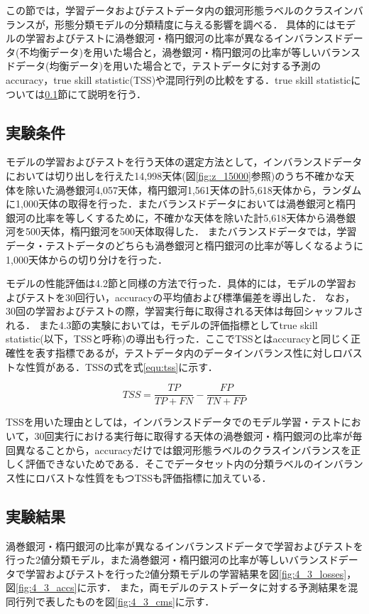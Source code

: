 \documentclass[a4j, 11pt]{jreport}
\begin{document}
この節では，学習データおよびテストデータ内の銀河形態ラベルのクラスインバランスが，形態分類モデルの分類精度に与える影響を調べる．
具体的にはモデルの学習およびテストに渦巻銀河・楕円銀河の比率が異なるインバランスドデータ(不均衡データ)を用いた場合と，渦巻銀河・楕円銀河の比率が等しいバランスドデータ(均衡データ)を用いた場合とで，テストデータに対する予測のaccuracy，true skill statistic(TSS)や混同行列の比較をする．true skill statisticについては\ref{sec:4-3-1}節にて説明を行う．

\subsection{実験条件}
\label{sec:4-3-1}
モデルの学習およびテストを行う天体の選定方法として，インバランスドデータにおいては切り出しを行えた14,998天体(図\ref{fig:z_15000}参照)のうち不確かな天体を除いた渦巻銀河4,057天体，楕円銀河1,561天体の計5,618天体から，ランダムに1,000天体の取得を行った．またバランスドデータにおいては渦巻銀河と楕円銀河の比率を等しくするために，不確かな天体を除いた計5,618天体から渦巻銀河を500天体，楕円銀河を500天体取得した．
またバランスドデータでは，学習データ・テストデータのどちらも渦巻銀河と楕円銀河の比率が等しくなるように1,000天体からの切り分けを行った．

モデルの性能評価は4.2節と同様の方法で行った．具体的には，モデルの学習およびテストを30回行い，accuracyの平均値および標準偏差を導出した．
なお，30回の学習およびテストの際，学習実行毎に取得される天体は毎回シャッフルされる．
また4.3節の実験においては，モデルの評価指標としてtrue skill statistic(以下，TSSと呼称)の導出も行った．ここでTSSとはaccuracyと同じく正確性を表す指標であるが，テストデータ内のデータインバランス性に対しロバストな性質がある．TSSの式を式\ref{equ:tss}に示す．

\begin{equation}
	TSS = \frac{TP}{TP + FN} - \frac{FP}{TN + FP}
 \label{equ:tss}
\end{equation}

TSSを用いた理由としては，インバランスドデータでのモデル学習・テストにおいて，30回実行における実行毎に取得する天体の渦巻銀河・楕円銀河の比率が毎回異なることから，accuracyだけでは銀河形態ラベルのクラスインバランスを正しく評価できないためである．そこでデータセット内の分類ラベルのインバランス性にロバストな性質をもつTSSも評価指標に加えている．

\subsection{実験結果}
渦巻銀河・楕円銀河の比率が異なるインバランスドデータで学習およびテストを行った2値分類モデル，また渦巻銀河・楕円銀河の比率が等しいバランスドデータで学習およびテストを行った2値分類モデルの学習結果を図\ref{fig:4_3_losses}，図\ref{fig:4_3_accs}に示す．
また，両モデルのテストデータに対する予測結果を混同行列で表したものを図\ref{fig:4_3_cms}に示す．
\end{document}
